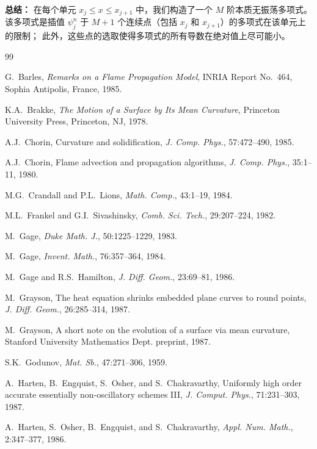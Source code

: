 \documentclass[11pt,a4paper]{article}
\begin{document}
\textbf{总结：} 在每个单元 $x_j \leq x \leq x_{j+1}$ 中，我们构造了一个 $M$ 阶本质无振荡多项式。
该多项式是插值 $\psi_j^n$ 于 $M+1$ 个连续点（包括 $x_j$ 和 $x_{j+1}$）的多项式在该单元上的限制；
此外，这些点的选取使得多项式的所有导数在绝对值上尽可能小。

\newpage

\begin{thebibliography}{99}

G.~Barles,
\emph{Remarks on a Flame Propagation Model},
INRIA Report No.~464, Sophia Antipolis, France, 1985.

K.A.~Brakke,
\emph{The Motion of a Surface by Its Mean Curvature},
Princeton University Press, Princeton, NJ, 1978.

A.J.~Chorin,
Curvature and solidification,
\emph{J. Comp. Phys.}, 57:472--490, 1985.

A.J.~Chorin,
Flame advection and propagation algorithms,
\emph{J. Comp. Phys.}, 35:1--11, 1980.

M.G.~Crandall and P.L.~Lions,
\emph{Math. Comp.}, 43:1--19, 1984.

M.L.~Frankel and G.I.~Sivashinsky,
\emph{Comb. Sci. Tech.}, 29:207--224, 1982.

M.~Gage,
\emph{Duke Math. J.}, 50:1225--1229, 1983.

M.~Gage,
\emph{Invent. Math.}, 76:357--364, 1984.

M.~Gage and R.S.~Hamilton,
\emph{J. Diff. Geom.}, 23:69--81, 1986.

M.~Grayson,
The heat equation shrinks embedded plane curves to round points,
\emph{J. Diff. Geom.}, 26:285--314, 1987.

M.~Grayson,
A short note on the evolution of a surface via mean curvature,
Stanford University Mathematics Dept. preprint, 1987.

S.K.~Godunov,
\emph{Mat. Sb.}, 47:271--306, 1959.

A.~Harten, B.~Engquist, S.~Osher, and S.~Chakravarthy,
Uniformly high order accurate essentially non-oscillatory schemes III,
\emph{J. Comput. Phys.}, 71:231--303, 1987.

A.~Harten, S.~Osher, B.~Engquist, and S.~Chakravarthy,
\emph{Appl. Num. Math.}, 2:347--377, 1986.


\end{thebibliography}
\end{document}
